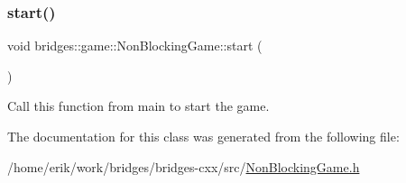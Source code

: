 \subsubsection{\texorpdfstring{start()}{start()}}
{\footnotesize\ttfamily void bridges\+::game\+::\+Non\+Blocking\+Game\+::start (\begin{DoxyParamCaption}{ }\end{DoxyParamCaption})\hspace{0.3cm}{\ttfamily [inline]}}



Call this function from main to start the game. 



The documentation for this class was generated from the following file\+:\begin{DoxyCompactItemize}
\item 
/home/erik/work/bridges/bridges-\/cxx/src/\hyperlink{_non_blocking_game_8h}{Non\+Blocking\+Game.\+h}\end{DoxyCompactItemize}
